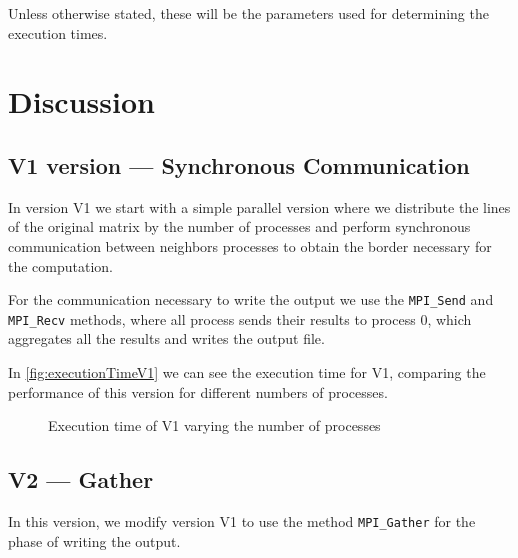 \documentclass[conference]{IEEEtran}
\begin{document}
Unless otherwise stated, these will be the parameters used for determining the execution times.

\section{Discussion}

\subsection{V1 version --- Synchronous Communication}\label{sec:v1}

In version V1 we start with a simple parallel version where we distribute the lines of the original matrix by the number of processes and perform synchronous communication between neighbors processes to obtain the border necessary for the computation.

For the communication necessary to write the output we use the \texttt{MPI\_Send} and \texttt{MPI\_Recv} methods, where all process sends their results to process 0, which aggregates all the results and writes the output file.

In \autoref{fig:executionTimeV1} we can see the execution time for V1, comparing the performance of this version for different numbers of processes.

\begin{figure}[ht]
  \centering
  \caption{Execution time of V1 varying the number of processes}
  \label{fig:executionTimeV1}
\end{figure}

\subsection{V2 --- Gather}\label{sec:v2}
In this version, we modify version V1 to use the method \texttt{MPI\_Gather} for the phase of writing the output.
\end{document}
